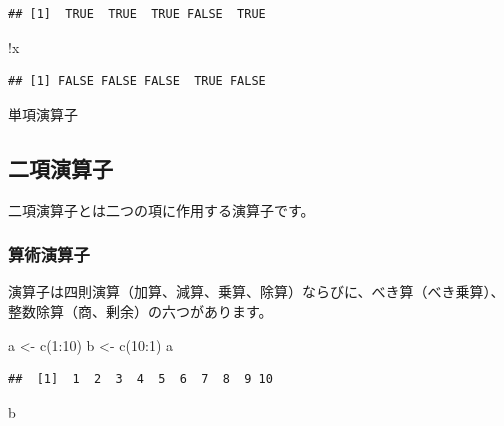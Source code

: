 \documentclass[
  12pt,
]{book}
\newenvironment{Shaded}{\begin{snugshade}}{\end{snugshade}}
\newcommand{\DecValTok}[1]{\textcolor[rgb]{0.00,0.00,0.81}{#1}}
\newcommand{\FunctionTok}[1]{\textcolor[rgb]{0.00,0.00,0.00}{#1}}
\newcommand{\NormalTok}[1]{#1}
\newcommand{\OtherTok}[1]{\textcolor[rgb]{0.56,0.35,0.01}{#1}}
\newcommand{\SpecialCharTok}[1]{\textcolor[rgb]{0.00,0.00,0.00}{#1}}
\begin{document}
\begin{verbatim}
## [1]  TRUE  TRUE  TRUE FALSE  TRUE
\end{verbatim}

\begin{Shaded}
\begin{Highlighting}[]
\SpecialCharTok{!}\NormalTok{x}
\end{Highlighting}
\end{Shaded}

\begin{verbatim}
## [1] FALSE FALSE FALSE  TRUE FALSE
\end{verbatim}

単項演算子

\hypertarget{ux4e8cux9805ux6f14ux7b97ux5b50}{%
\subsection{二項演算子}\label{ux4e8cux9805ux6f14ux7b97ux5b50}}

二項演算子とは二つの項に作用する演算子です。

\hypertarget{ux7b97ux8853ux6f14ux7b97ux5b50}{%
\subsubsection{算術演算子}\label{ux7b97ux8853ux6f14ux7b97ux5b50}}

演算子は四則演算（加算、減算、乗算、除算）ならびに、べき算（べき乗算）、整数除算（商、剰余）の六つがあります。

\begin{Shaded}
\begin{Highlighting}[]
\NormalTok{a }\OtherTok{\textless{}{-}} \FunctionTok{c}\NormalTok{(}\DecValTok{1}\SpecialCharTok{:}\DecValTok{10}\NormalTok{)}
\NormalTok{b }\OtherTok{\textless{}{-}} \FunctionTok{c}\NormalTok{(}\DecValTok{10}\SpecialCharTok{:}\DecValTok{1}\NormalTok{)}
\NormalTok{a}
\end{Highlighting}
\end{Shaded}

\begin{verbatim}
##  [1]  1  2  3  4  5  6  7  8  9 10
\end{verbatim}

\begin{Shaded}
\begin{Highlighting}[]
\NormalTok{b}
\end{Highlighting}
\end{Shaded}
\end{document}
